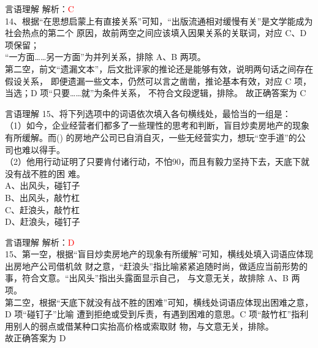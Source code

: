 \documentclass[aspectratio=169]{beamer}
\begin{document}
\begin{frame}[t]{言语理解}
    解析：\textcolor{red}{C}\\
    14、根据“在思想启蒙上有直接关系”可知，“出版流通相对缓慢有关”是文学能成为社会热点的第二个
    原因，故前两空之间应该填入因果关系的关联词，对应 C、D 项保留；\\
    “一方面……另一方面”为并列关系，排除 A、B 两项。\\
    第二空，前文“遗漏文本”，后文批评家的推论还是能够有效，说明两句话之间存在假设关系，
    即便遗漏一些文本，仍然可以言之凿凿，推论基本有效，对应 C 项，当选；D 项“只要……就”为条件关系，
    不符合文段逻辑，排除。
    故正确答案为 C
\end{frame}



\begin{frame}[t]{言语理解}
    15、将下列选项中的词语依次填入各句横线处，最恰当的一组是：\\
    （1）如今，企业经营者们都多了一些理性的思考和判断，盲目炒卖房地产的现象有所缓解。而() 的房地产公司已自消自灭，一些无经营实力，想玩“空手道”的公司也难以得手。\\
    （2）他用行动证明了只要肯付诸行动，不怕90，而且有毅力坚持下去，天底下就没有战不胜的困
    难。\\
    A、出风头，碰钉子\\
    B、出风头，敲竹杠\\
    C、赶浪头，敲竹杠\\
    D、赶浪头，碰钉子\\
\end{frame}

\begin{frame}[t]{言语理解}
    解析：\textcolor{red}{D}\\
    15、第一空，根据“盲目炒卖房地产的现象有所缓解”可知，横线处填入词语应体现出房地产公司借机敛
    财之意，“赶浪头”指比喻紧紧追随时尚，做适应当前形势的事，符合文意。“出风头”指出头露面显示自己，
    与文意无关，故排除 A、B 两项。\\
    第二空，根据“天底下就没有战不胜的困难”可知，横线处词语应体现出困难之意，D 项“碰钉子”比喻
    遭到拒绝或受到斥责，有遇到困难的意思。C 项“敲竹杠”指利用别人的弱点或借某种口实抬高价格或索取财
    物，与文意无关，排除。\\
    故正确答案为 D\\
\end{frame}
\end{document}
